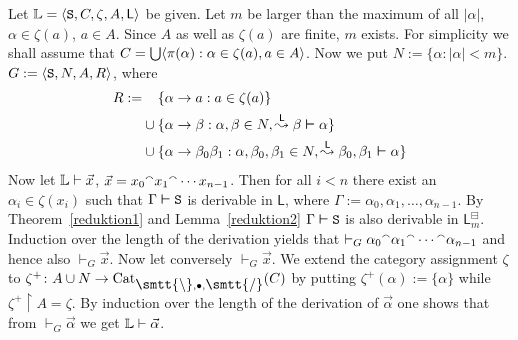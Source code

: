 \proofbeg
Let $\mathbb{L} = \langle \mbox{\tt S}, C, \zeta, A, \mathsf{L}\rangle$ be given. 
Let $m$ be larger than the maximum of all $|\alpha|$, $\alpha
\in \zeta(a)$, $a \in A$. Since $A$ as well as $\zeta(a)$
are finite, $m$ exists. For simplicity we shall assume that
$C = \bigcup \langle \pi(\alpha) : \alpha \in \zeta(a),
a \in A\rangle$. Now we put $N := \{\alpha : |\alpha| < m\}$.
$G := \langle \mbox{\tt S}, N, A, R\rangle$, where
\begin{align}
\begin{split}
R := & \phantom{\mbox{}\cup\mbox{}}\{\alpha \pf a : a \in \zeta(a)\} \\
     & \cup \{\alpha \pf \beta : \alpha, \beta \in N,
     \stackrel{\mathsf{L}}{\leadsto} \beta \bvdash \alpha\} \\
     & \cup \{\alpha \pf \beta_0 \beta_1 : 
	\alpha, \beta_0, \beta_1 \in N, 
	\stackrel{\mathsf{L}}{\leadsto} 
	\beta_0, \beta_1 \bvdash \alpha\}
\end{split}
\end{align}
Now let $\mathbb{L} \vdash \vec{x}$, $\vec{x} = x_0 {^{\smallfrown}} x_1 {^{\smallfrown}}
\dotsb x_{n-1}$. Then for all $i < n$ there exist 
an $\alpha_i \in \zeta(x_i)$ such that 
$\Gamma \boldsymbol{\vdash} \mbox{\tt S}$ is derivable 
in $\mathsf{L}$, where $\Gamma := \alpha_0, \alpha_1, \dotsc, \alpha_{n-1}$. 
By Theorem~\ref{reduktion1} and Lemma~\ref{reduktion2} $\Gamma \boldsymbol{\vdash}
\mbox{\tt S}$ is also derivable in $\mathsf{L}_m^{\boxminus}$. Induction
over the length of the derivation yields that $\vdash_G \alpha_0
{^{\smallfrown}} \alpha_1 {^{\smallfrown}} \dotsb {^{\smallfrown}} \alpha_{n-1}$ and hence also
$\vdash_G \vec{x}$. Now let conversely $\vdash_G \vec{x}$. We
extend the category assignment $\zeta$ to $\zeta^+ \colon A \cup N \pf
\Cat_{\mbox{\smtt{\tb}}, \bullet, \mbox{\smtt{\tf}}}(C)$ by putting
$\zeta^+(\alpha) := \{\alpha\}$ while $\zeta^+ \restriction A =
\zeta$. By induction over the length of the derivation of
$\vec{\alpha}$ one shows that from $\vdash_G \vec{\alpha}$ we get
$\mathbb{L} \vdash \vec{\alpha}$. 
\proofend

